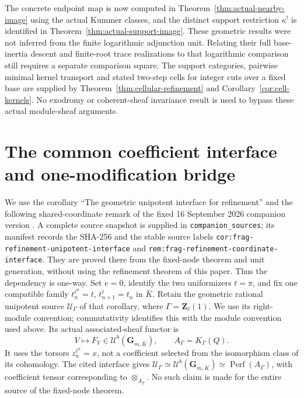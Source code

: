 \documentclass[11pt]{article}
\theoremstyle{definition}
\theoremstyle{remark}
\newcommand{\Perf}{\operatorname{Perf}}
\begin{document}
The concrete endpoint map is now computed in
Theorem~\ref{thm:actual-nearby-image} using the actual Kummer classes,
and the distinct support restriction $\kappa^!$ is identified in
Theorem~\ref{thm:actual-support-image}.  These geometric results were
not inferred from the finite logarithmic adjunction unit.  Relating
their full base-inertia descent and finite-root trace realizations to
that logarithmic comparison still requires a separate comparison
square.  The support categories, pairwise minimal kernel transport and stated
two-step cells for integer cuts over a fixed base are supplied
by Theorem~\ref{thm:cellular-refinement} and
Corollary~\ref{cor:cell-kernels}.  No exodromy or coherent-sheaf invariance
result is used to bypass these actual module-sheaf arguments.

\section{The common coefficient interface and one-modification bridge}
\label{sec:local-realization-bridge}
We use the corollary ``The geometric unipotent interface for refinement''
and the following shared-coordinate remark of the fixed
16 September 2026 companion version \cite{LocalThreeRealizations}.
A complete source snapshot is supplied in \texttt{companion\_sources};
its manifest records the SHA-256 and the stable source labels
\texttt{cor:frag-refinement-unipotent-interface} and
\texttt{rem:frag-refinement-coordinate-interface}.
They are proved there from the fixed-node theorem and unit generation,
without using the refinement theorem of this paper.  Thus the dependency
is one-way.  Set $e=0$, identify the two uniformizers $t=\pi$, and fix
one compatible family $t_n^{\ell^n}=t$, $t_{n+1}^{\ell}=t_n$ in
$\bar K$.  Retain the geometric rational unipotent source
$\mathcal U_\Gamma$ of that corollary, where $\Gamma=\mathbf Z_\ell(1)$.
We use its right-module convention; commutativity identifies this with
the module convention used above.  Its actual associated-sheaf functor is
\[
 V\longmapsto F_V\in\mathcal U^b(\mathbf G_{m,\bar K}),\qquad
 A_\Gamma=K_\Gamma(Q).
\]
It uses the torsors $z_n^{\ell^n}=x$, not a coefficient selected from
the isomorphism class of its cohomology.  The cited interface gives
$\mathcal U_\Gamma\simeq\mathcal U^b(\mathbf G_{m,\bar K})
\simeq\Perf(A_\Gamma)$, with coefficient tensor corresponding to
$\otimes_{A_\Gamma}$.  No such claim is made for the entire source of
the fixed-node theorem.
\end{document}
